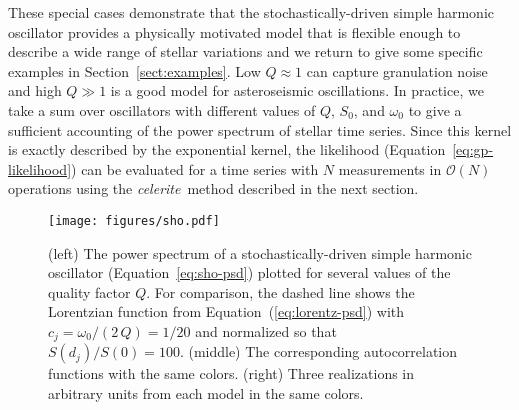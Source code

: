 \documentclass[manuscript, letterpaper]{aastex6}
\newcommand{\celeriteterm}{\emph{celerite}}
\newcommand{\figurelabel}[1]{\label{fig:#1}}
\renewcommand{\eqref}[1]{\ref{eq:#1}}
\newcommand{\Eq}[1]{Equation~(\eqref{#1})}
\newcommand{\eq}[1]{\Eq{#1}}
\newcommand{\eqalt}[1]{Equation~\eqref{#1}}
\newcommand{\sectionname}{Section}
\newcommand{\sectref}[1]{\ref{sect:#1}}
\newcommand{\Sect}[1]{\sectionname~\sectref{#1}}
\newcommand{\sect}[1]{\Sect{#1}}
\newcommand{\response}[1]{{#1}}
\begin{document}
These special cases demonstrate that the stochastically-driven simple harmonic
oscillator provides a physically motivated model that is flexible enough to
describe a wide range of stellar variations and we return to give some
specific examples in \sect{examples}.
Low $Q \approx 1$ can capture granulation noise and high $Q \gg 1$ is a good
model for asteroseismic oscillations.
In practice, we take a sum over oscillators with different values of $Q$,
$S_0$, and $\omega_0$ to give a sufficient accounting of the power spectrum
of stellar time series.
Since this kernel is exactly described by the exponential kernel, the
likelihood (\eqalt{gp-likelihood}) can be evaluated for a time series with $N$
measurements in $\mathcal{O}(N)$ operations using the \celeriteterm\ method
described in the next section.

\begin{figure}[!hptb]
    \begin{center}
        \texttt{[image: figures/sho.pdf]}
        \caption{(left) The power spectrum of a stochastically-driven simple harmonic
            oscillator (\eqalt{sho-psd}) plotted for several values of the quality
            factor $Q$.
            For comparison, the dashed line shows the Lorentzian function from
            \eq{lorentz-psd} with $c_j = \omega_0/(2\,Q) = 1/20$ and normalized so that
            $S(d_j)/S(0) = 100$.
            (middle) The corresponding autocorrelation functions with the same colors.
            \response{(right) Three realizations in arbitrary units from each model in
                the same colors.}
            \figurelabel{sho}}
    \end{center}
\end{figure}
\end{document}

